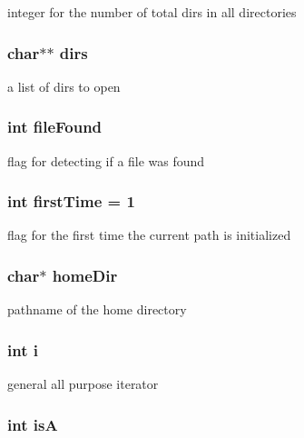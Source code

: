 integer for the number of total dirs in all directories 
\subsubsection{\setlength{\rightskip}{0pt plus 5cm}char$\ast$$\ast$ {\bf dirs}}\label{dir_8c_4321be2b2a89366608753004f8aa3c3b}


a list of dirs to open 
\subsubsection{\setlength{\rightskip}{0pt plus 5cm}int {\bf file\-Found}}\label{dir_8c_2aed5c59d349e05080633d8087708727}


flag for detecting if a file was found 
\subsubsection{\setlength{\rightskip}{0pt plus 5cm}int {\bf first\-Time} = 1}\label{dir_8c_d4066c6e83290040e1f715f0617d53f7}


flag for the first time the current path is initialized 
\subsubsection{\setlength{\rightskip}{0pt plus 5cm}char$\ast$ {\bf home\-Dir}}\label{dir_8c_ca6b88b088549f9d23c5ecbe9cea4b26}


pathname of the home directory 
\subsubsection{\setlength{\rightskip}{0pt plus 5cm}int {\bf i}}\label{dir_8c_cb559820d9ca11295b4500f179ef6392}


general all purpose iterator 
\subsubsection{\setlength{\rightskip}{0pt plus 5cm}int {\bf is\-A}}\label{dir_8c_2129538ee7dbdcdedb69a64dfb8df480}


